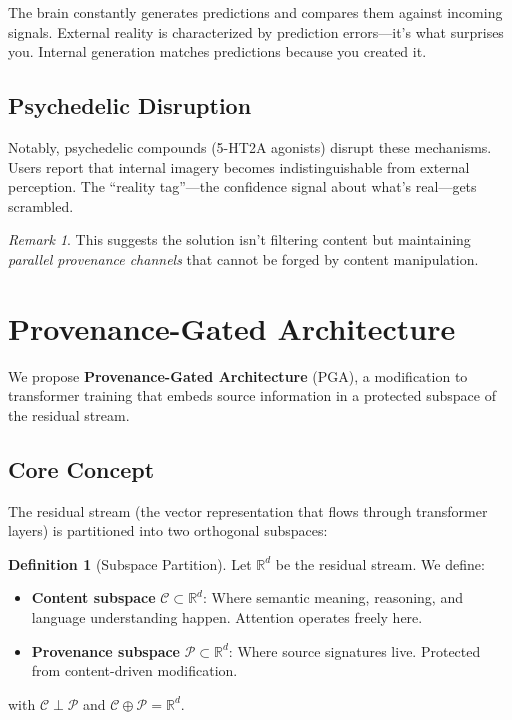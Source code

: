 \documentclass[11pt,a4paper]{article}
\theoremstyle{plain}
\theoremstyle{definition}
\newtheorem{definition}[theorem]{Definition}
\theoremstyle{remark}
\newtheorem{remark}[theorem]{Remark}
\newcommand{\R}{\mathbb{R}}
\newcommand{\Cspace}{\mathcal{C}}
\newcommand{\Pspace}{\mathcal{P}}
\begin{document}
The brain constantly generates predictions and compares them against incoming signals. External reality is characterized by prediction errors---it's what surprises you. Internal generation matches predictions because you created it.

\subsection{Psychedelic Disruption}

Notably, psychedelic compounds (5-HT2A agonists) disrupt these mechanisms. Users report that internal imagery becomes indistinguishable from external perception. The ``reality tag''---the confidence signal about what's real---gets scrambled.

\begin{remark}
This suggests the solution isn't filtering content but maintaining \emph{parallel provenance channels} that cannot be forged by content manipulation.
\end{remark}

\section{Provenance-Gated Architecture}

We propose \textbf{Provenance-Gated Architecture} (PGA), a modification to transformer training that embeds source information in a protected subspace of the residual stream.

\subsection{Core Concept}

The residual stream (the vector representation that flows through transformer layers) is partitioned into two orthogonal subspaces:

\begin{definition}[Subspace Partition]
Let $\R^d$ be the residual stream. We define:
\begin{itemize}
    \item \textbf{Content subspace} $\Cspace \subset \R^d$: Where semantic meaning, reasoning, and language understanding happen. Attention operates freely here.
    \item \textbf{Provenance subspace} $\Pspace \subset \R^d$: Where source signatures live. Protected from content-driven modification.
\end{itemize}
with $\Cspace \perp \Pspace$ and $\Cspace \oplus \Pspace = \R^d$.
\end{definition}
\end{document}
